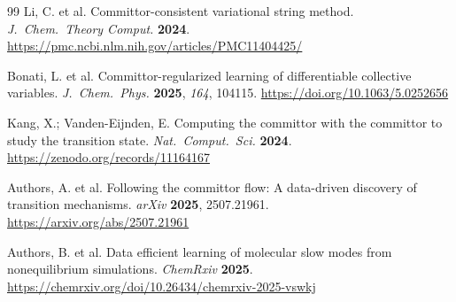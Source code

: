\documentclass[12pt, a4paper]{article}
\begin{document}
\begin{thebibliography}{99}
Li, C. et al.
\newblock Committor-consistent variational string method.
\newblock \emph{J.\ Chem.\ Theory Comput.} \textbf{2024}.
\newblock \url{https://pmc.ncbi.nlm.nih.gov/articles/PMC11404425/}

Bonati, L. et al.
\newblock Committor-regularized learning of differentiable collective variables.
\newblock \emph{J.\ Chem.\ Phys.} \textbf{2025}, \emph{164}, 104115.
\newblock \url{https://doi.org/10.1063/5.0252656}

Kang, X.; Vanden-Eijnden, E.
\newblock Computing the committor with the committor to study the transition state.
\newblock \emph{Nat.\ Comput.\ Sci.} \textbf{2024}.
\newblock \url{https://zenodo.org/records/11164167}

Authors, A. et al.
\newblock Following the committor flow: A data-driven discovery of transition mechanisms.
\newblock \emph{arXiv} \textbf{2025}, 2507.21961.
\newblock \url{https://arxiv.org/abs/2507.21961}

Authors, B. et al.
\newblock Data efficient learning of molecular slow modes from nonequilibrium simulations.
\newblock \emph{ChemRxiv} \textbf{2025}.
\newblock \url{https://chemrxiv.org/doi/10.26434/chemrxiv-2025-vswkj}

\end{thebibliography}
\end{document}
